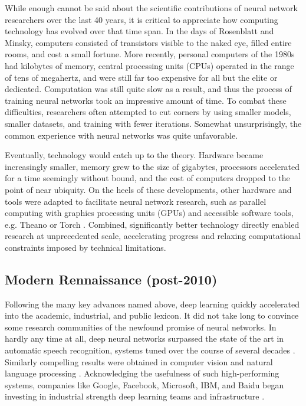 While enough cannot be said about the scientific contributions of neural network researchers over the last 40 years, it is critical to appreciate how computing technology has evolved over that time span.
In the days of Rosenblatt and Minsky, computers consisted of transistors visible to the naked eye, filled entire rooms, and cost a small fortune.
More recently, personal computers of the 1980s had kilobytes of memory, central processing units (CPUs) operated in the range of tens of megahertz, and were still far too expensive for all but the elite or dedicated.
Computation was still quite slow as a result, and thus the process of training neural networks took an impressive amount of time.
To combat these difficulties, researchers often attempted to cut corners by using smaller models, smaller datasets, and training with fewer iterations.
Somewhat unsurprisingly, the common experience with neural networks was quite unfavorable.

Eventually, technology would catch up to the theory.
Hardware became increasingly smaller, memory grew to the size of gigabytes, processors accelerated for a time seemingly without bound, and the cost of computers dropped to the point of near ubiquity.
On the heels of these developments, other hardware and tools were adapted to facilitate neural network research, such as parallel computing with graphics processing units (GPUs) and accessible software tools, e.g. Theano \cite{Bergstra2010Theano} or Torch \cite{Collobert2011Torch7}.
Combined, significantly better technology directly enabled research at unprecedented scale, accelerating progress and relaxing computational constraints imposed by technical limitations.


\subsection{Modern Rennaissance (post-2010)}
\label{subsec:rennaissance}

Following the many key advances named above, deep learning quickly accelerated into the academic, industrial, and public lexicon.
It did not take long to convince some research communities of the newfound promise of neural networks.
In hardly any time at all, deep neural networks surpassed the state of the art in automatic speech recognition, systems tuned over the course of several decades \cite{Hinton2012Deep}.
Similarly compelling results were obtained in computer vision \cite{Krizhevsky2012Imagenet} and natural language processing \cite{Sutskever2011Generating}.
Acknowledging the usefulness of such high-performing systems, companies like Google, Facebook, Microsoft, IBM, and Baidu began investing in industrial strength deep learning teams and infrastructure \cite{Dean2012Large}.

